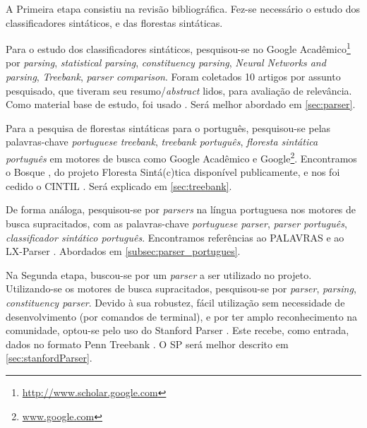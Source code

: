 A Primeira etapa consistiu na revisão bibliográfica. Fez-se necessário o estudo dos classificadores sintáticos, e das florestas sintáticas. 

Para o estudo dos classificadores sintáticos, pesquisou-se no Google Acadêmico\footnote{\url{http://www.scholar.google.com}} por \textit{parsing}, \textit{statistical parsing}, \textit{constituency parsing}, \textit{Neural Networks and parsing}, \textit{Treebank}, \textit{parser comparison}. Foram coletados 10 artigos por assunto pesquisado, que tiveram seu resumo/\textit{abstract} lidos, para avaliação de relevância. Como material base de estudo, foi usado  \cite{Manning1999FoundationsNLP}. Será melhor abordado em \ref{sec:parser}.

Para a pesquisa de florestas sintáticas para o português, pesquisou-se pelas palavras-chave \textit{portuguese treebank}, \textit{treebank português}, \textit{floresta sintática português} em motores de busca como Google Acadêmico e Google\footnote{\url{www.google.com}}. Encontramos o Bosque \cite{bick2008FlorestaSintatica}, do projeto Floresta Sintá(c)tica disponível publicamente, e nos foi cedido o CINTIL \cite{cintil_handbook}. Será explicado em \ref{sec:treebank}.

De forma análoga, pesquisou-se por \textit{parsers} na língua portuguesa nos motores de busca supracitados, com as palavras-chave \textit{portuguese parser}, \textit{parser português}, \textit{classificador sintático português}. Encontramos referências ao PALAVRAS \cite{bick2000palavras} e ao LX-Parser \cite{siteLxParser}. Abordados em \ref{subsec:parser_portugues}.

Na Segunda etapa, buscou-se por um \textit{parser} a ser utilizado no projeto. Utilizando-se os motores de busca supracitados, pesquisou-se por \textit{parser}, \textit{parsing}, \textit{constituency parser}. Devido à sua robustez, fácil utilização sem necessidade de desenvolvimento (por comandos de terminal), e por ter amplo reconhecimento na comunidade, optou-se pelo uso do Stanford Parser \cite{fastAccurate}. Este recebe, como entrada, dados no formato Penn Treebank \cite{buildingPTB}. O SP será melhor descrito em \ref{sec:stanfordParser}.


